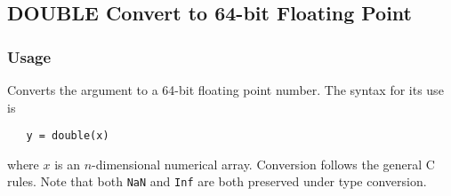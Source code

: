 %
%
%
\subsection{DOUBLE Convert to 64-bit Floating Point}
\subsubsection{Usage}
Converts the argument to a 64-bit floating point number.  The syntax
for its use is
\begin{verbatim}
   y = double(x)
\end{verbatim}
where $x$ is an $n$-dimensional numerical array.  Conversion follows the general C rules.  Note that both \verb|NaN| and \verb|Inf| are both preserved under type conversion.
